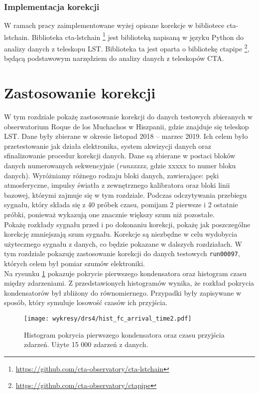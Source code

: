 \documentclass[a4paper,11pt,twoside]{article}
\begin{document}
\subsubsection{Implementacja korekcji}
W ramach pracy zaimplementowane wyżej opisane korekcje w bibliotece cta-lstchain. Biblioteka cta-lstchain  \footnote{\url{https://github.com/cta-observatory/cta-lstchain}} jest biblioteką napisaną w języku Python do analizy danych z teleskopu LST. Biblioteka ta jest oparta o bibliotekę ctapipe \footnote{\url{https://github.com/cta-observatory/ctapipe}}, będącą podstawowym narzędziem do analizy danych z teleskopów CTA.

\newpage
\section{Zastosowanie korekcji}
W tym rozdziale pokażę zastosowanie korekcji do danych testowych zbieranych w obserwatorium Roque de los Muchachos w Hiszpanii, gdzie znajduje się teleskop LST. Dane były zbierane w okresie listopad 2018 -- marzec 2019. Ich celem było przetestowanie jak działa elektronika, system akwizycji danych oraz sfinalizowanie procedur korekcji danych. Dane są zbierane w postaci bloków danych numerowanych sekwencyjnie (\textsl{runxxxxx}, gdzie xxxxx to numer bloku danych). Wyróżniamy różnego rodzaju bloki danych, zawierające: pęki atmosferyczne, impulsy światła z zewnętrznego kalibratora oraz bloki linii bazowej, którymi zajmuje się w tym rozdziale. Podczas odczytywania przebiegu sygnału, który składa się z 40 próbek czasu, pomijam 2 pierwsze i 2 ostatnie próbki, ponieważ wykazują one znacznie większy szum niż pozostałe.
\\ Pokażę rozkłady sygnału przed i po dokonaniu korekcji, pokażę jak poszczególne korekcję zmniejszają szum sygnału. Korekcje są niezbędne w celu wydobycia użytecznego sygnału z danych, co będzie pokazane w dalszych rozdziałach. W tym rozdziale pokazuję zastosowanie korekcji do danych testowych \texttt{run00097}, których celem był pomiar szumów elektroniki. \\ 
Na rysunku \ref{fig:data_hist} pokazuje pokrycie pierwszego kondensatora oraz histogram czasu między zdarzeniami. Z przedstawionych histogramów wynika, że rozkład pokrycia kondensatorów był zbliżony do równomiernego.
Przypadki były zapisywane w sposób, który symuluje losowość czasów ich przyjścia. 
\begin{figure}[H] 
\centering
\texttt{[image: wykresy/drs4/hist\_fc\_arrival\_time2.pdf]}
\caption{Histogram pokrycia pierwszego kondensatora oraz czasu przyjścia zdarzeń. Użyte 15 000 zdarzeń z danych.}
\label{fig:data_hist}
\end{figure}
\end{document}
